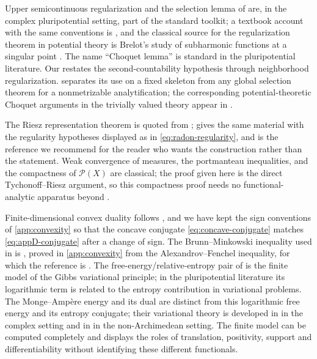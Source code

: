 Upper semicontinuous regularization and the selection lemma of
 are, in the complex pluripotential setting, part
of the standard toolkit; a textbook account with the same conventions is
\cite[Chapter~1 and Chapter~4]{GZ17}, and the classical source for the
regularization theorem in potential theory is Brelot's study of subharmonic
functions at a singular point \cite{Bre49}.  The name ``Choquet lemma'' is
standard in the pluripotential literature.  Our
 restates the second-countability hypothesis
through neighborhood regularization.  
separates its use on a fixed skeleton from any global selection theorem
for a nonmetrizable analytification; the corresponding potential-theoretic
Choquet arguments in the trivially valued theory appear in \cite{BJ22}.

The Riesz representation theorem is quoted from
\cite[Theorems~2.14 and~6.19]{Rud87}; \cite[Chapter~7]{Fol99} gives the same
material with the regularity hypotheses displayed as in
\eqref{eq:radon-regularity}, and is the reference we recommend for the reader
who wants the construction rather than the statement.  Weak convergence of
measures, the portmanteau inequalities, and the compactness of
$\mathcal P(X)$ are classical; the proof given here is the direct
Tychonoff--Riesz argument, so this compactness proof needs no
functional-analytic apparatus beyond .

Finite-dimensional convex duality follows \cite[Chapters~10, 12, and~23]{Roc70},
and we have kept the sign conventions of \cref{app:convexity} so that the
concave conjugate \eqref{eq:concave-conjugate} matches
\eqref{eq:appD-conjugate} after a change of sign.  The Brunn--Minkowski
inequality used in  is
, proved in \cref{app:convexity} from the
Alexandrov--Fenchel inequality, for which the reference is \cite{Sch14}.  The
free-energy/relative-entropy pair of  is the
finite model of the Gibbs variational principle; in the pluripotential
literature its logarithmic term is related to the entropy contribution in
variational problems.  The Monge--Amp\`ere energy and its dual are distinct
from this logarithmic free energy and its entropy conjugate; their
variational theory is developed in \cite{BBGZ13} in the complex setting
and in \cite{BFJ15,BJ22} in the non-Archimedean setting.  The finite model
can be computed completely and displays the roles of translation,
positivity, support and differentiability without identifying these
different functionals.

